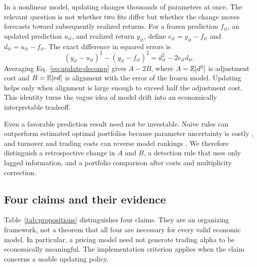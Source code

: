 In a nonlinear model, updating changes thousands of parameters at once. The relevant question is not whether two fits differ but whether the change moves forecasts toward subsequently realized returns. For a frozen prediction $f_{it}$, an updated prediction $u_{it}$, and realized return $y_{it}$, define $e_{it}=y_{it}-f_{it}$ and $d_{it}=u_{it}-f_{it}$. The exact difference in squared errors is
\begin{equation}
 (y_{it}-u_{it})^2-(y_{it}-f_{it})^2=d_{it}^2-2e_{it}d_{it}.
 \label{eq:update-decomp}
\end{equation}
Averaging Eq.~\eqref{eq:update-decomp} gives $A-2B$, where $A=\mathbb{E}[d^2]$ is adjustment cost and $B=\mathbb{E}[ed]$ is alignment with the error of the frozen model. Updating helps only when alignment is large enough to exceed half the adjustment cost. This identity turns the vague idea of model drift into an economically interpretable tradeoff.

Even a favorable prediction result need not be investable. Naive rules can outperform estimated optimal portfolios because parameter uncertainty is costly \citep{demiguel2009optimal}, and turnover and trading costs can reverse model rankings \citep{detzel2023costs}. We therefore distinguish a retrospective change in $A$ and $B$, a detection rule that uses only lagged information, and a portfolio comparison after costs and multiplicity correction.

\subsection{Four claims and their evidence}

Table~\ref{tab:propositions} distinguishes four claims. They are an organizing framework, not a theorem that all four are necessary for every valid economic model. In particular, a pricing model need not generate trading alpha to be economically meaningful. The implementation criterion applies when the claim concerns a usable updating policy.

